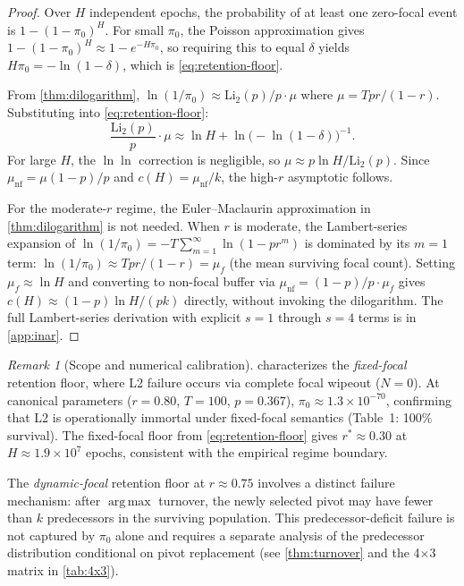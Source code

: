 \documentclass[11pt]{article}
\theoremstyle{plain}
\theoremstyle{definition}
\theoremstyle{remark}
\newtheorem{remark}[theorem]{Remark}
\DeclareMathOperator*{\argmax}{arg\,max}
\begin{document}
\begin{proof}
Over $H$ independent epochs, the probability of at least one
zero-focal event is $1 - (1 - \pi_0)^H$.  For small $\pi_0$, the
Poisson approximation gives $1 - (1-\pi_0)^H \approx 1 - e^{-H\pi_0}$,
so requiring this to equal $\delta$ yields $H\pi_0 = -\ln(1-\delta)$,
which is \eqref{eq:retention-floor}.

From \cref{thm:dilogarithm}, $\ln(1/\pi_0) \approx
\mathrm{Li}_2(p)/p \cdot \mu$ where $\mu = Tpr/(1-r)$.
Substituting into \eqref{eq:retention-floor}:
\[
  \frac{\mathrm{Li}_2(p)}{p} \cdot \mu
  \approx \ln H + \ln\!\bigl(-\ln(1-\delta)\bigr)^{-1}.
\]
For large $H$, the $\ln\ln$ correction is negligible, so
$\mu \approx p \ln H / \mathrm{Li}_2(p)$.  Since
$\mu_{\mathrm{nf}} = \mu(1-p)/p$ and $c(H) = \mu_{\mathrm{nf}}/k$,
the high-$r$ asymptotic follows.

For the moderate-$r$ regime, the Euler--Maclaurin approximation in
\cref{thm:dilogarithm} is not needed.  When $r$ is moderate, the
Lambert-series expansion of $\ln(1/\pi_0) = -T\sum_{m=1}^\infty
\ln(1-pr^m)$ is dominated by its $m = 1$ term:
$\ln(1/\pi_0) \approx Tpr/(1-r) = \mu_f$ (the mean surviving focal
count).  Setting $\mu_f \approx \ln H$ and converting to non-focal
buffer via $\mu_{\mathrm{nf}} = (1-p)/p \cdot \mu_f$ gives
$c(H) \approx (1-p)\ln H / (pk)$ directly, without invoking the
dilogarithm.  The full Lambert-series derivation with explicit $s = 1$
through $s = 4$ terms is in \cref{app:inar}.
\end{proof}

\begin{remark}[Scope and numerical calibration]\label{rem:retention-numerical}
 characterizes the \emph{fixed-focal}
retention floor, where L2 failure occurs via complete focal wipeout
($N = 0$).  At canonical parameters ($r = 0.80$, $T = 100$,
$p = 0.367$), $\pi_0 \approx 1.3 \times 10^{-70}$, confirming that L2
is operationally immortal under fixed-focal semantics (Table~1: 100\%
survival).  The fixed-focal floor from \eqref{eq:retention-floor} gives
$r^* \approx 0.30$ at $H \approx 1.9 \times 10^7$ epochs, consistent
with the empirical regime boundary.

The \emph{dynamic-focal} retention floor at $r \approx 0.75$ involves a
distinct failure mechanism: after $\argmax$ turnover, the newly selected
pivot may have fewer than $k$ predecessors in the surviving population.
This predecessor-deficit failure is not captured by $\pi_0$ alone and
requires a separate analysis of the predecessor distribution conditional
on pivot replacement (see \cref{thm:turnover} and the 4$\times$3
matrix in \cref{tab:4x3}).
\end{remark}
\end{document}
